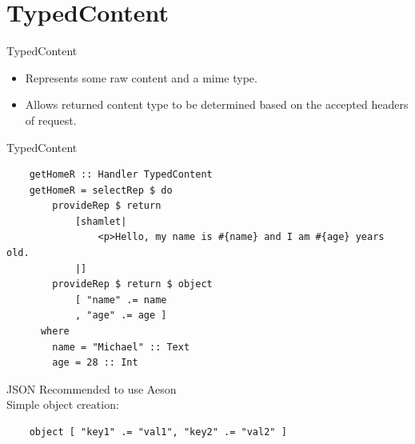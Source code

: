 \documentclass[pdf]{beamer}
\begin{document}
\section{TypedContent}

\begin{frame}{TypedContent}
  \begin{itemize}
  \item Represents some raw content and a mime type.
  \item Allows returned content type to be determined based on the
    accepted headers of request.
  \end{itemize}
\end{frame}

\begin{frame}[fragile]{TypedContent}
  \begin{verbatim}
    getHomeR :: Handler TypedContent
    getHomeR = selectRep $ do
        provideRep $ return
            [shamlet|
                <p>Hello, my name is #{name} and I am #{age} years old.
            |]
        provideRep $ return $ object
            [ "name" .= name
            , "age" .= age ]
      where
        name = "Michael" :: Text
        age = 28 :: Int
  \end{verbatim}
\end{frame}

\begin{frame}[fragile]{JSON}
  Recommended to use Aeson\\
  Simple object creation:
  \begin{verbatim}
    object [ "key1" .= "val1", "key2" .= "val2" ]
  \end{verbatim}
\end{frame}
\end{document}
